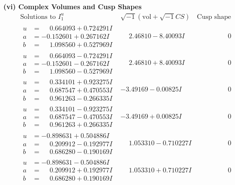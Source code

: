 \documentclass[1p]{elsarticle_modified}
\theoremstyle{definition}
\newcommand{\I}{\sqrt{-1}}
\begin{document}
\newpage\flushleft \textbf{(vi) Complex Volumes and Cusp Shapes}
$$\begin{array}{c|c|c}  
\text{Solutions to }I^u_{1}& \I (\text{vol} + \sqrt{-1}CS) & \text{Cusp shape}\\
 \hline 
\begin{aligned}
u &= \phantom{-}0.664093 + 0.724291 I \\
a &= -0.152601 + 0.267162 I \\
b &= \phantom{-}1.098560 + 0.527969 I\end{aligned}
 & \phantom{-}2.46810 - 8.40093 I & \phantom{-0.000000 } 0 \\ \hline\begin{aligned}
u &= \phantom{-}0.664093 - 0.724291 I \\
a &= -0.152601 - 0.267162 I \\
b &= \phantom{-}1.098560 - 0.527969 I\end{aligned}
 & \phantom{-}2.46810 + 8.40093 I & \phantom{-0.000000 } 0 \\ \hline\begin{aligned}
u &= \phantom{-}0.334101 + 0.923275 I \\
a &= \phantom{-}0.687547 + 0.470553 I \\
b &= \phantom{-}0.961263 - 0.266335 I\end{aligned}
 & -3.49169 - 0.00825 I & \phantom{-0.000000 } 0 \\ \hline\begin{aligned}
u &= \phantom{-}0.334101 - 0.923275 I \\
a &= \phantom{-}0.687547 - 0.470553 I \\
b &= \phantom{-}0.961263 + 0.266335 I\end{aligned}
 & -3.49169 + 0.00825 I & \phantom{-0.000000 } 0 \\ \hline\begin{aligned}
u &= -0.898631 + 0.504886 I \\
a &= \phantom{-}0.209912 - 0.192977 I \\
b &= \phantom{-}0.686280 - 0.190169 I\end{aligned}
 & \phantom{-}1.053310 - 0.710227 I & \phantom{-0.000000 } 0 \\ \hline\begin{aligned}
u &= -0.898631 - 0.504886 I \\
a &= \phantom{-}0.209912 + 0.192977 I \\
b &= \phantom{-}0.686280 + 0.190169 I\end{aligned}
 & \phantom{-}1.053310 + 0.710227 I & \phantom{-0.000000 } 0 \\ \hline\begin{aligned}

\end{aligned}
\end{array}$$
\end{document}
